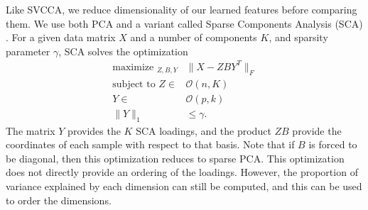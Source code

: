 Like SVCCA, we reduce dimensionality of our learned features before comparing
them. We use both PCA and a variant called Sparse Components Analysis (SCA)
\citep{chen2020new}. For a given data matrix $X$ and a number of components $K$,
and sparsity parameter $\gamma$, SCA solves the optimization
\begin{align*}
  \text{maximize }_{Z, B, Y} &\|X - Z B Y^{T}\|_{F} \\
  \text{subject to }Z \in &\mathcal{O}\left(n, K\right) \\
  Y \in &\mathcal{O}\left(p, k\right) \\
  \|Y\|_{1} &\leq \gamma.
\end{align*}
The matrix $Y$ provides the $K$ SCA loadings, and the product $ZB$ provide the
coordinates of each sample with respect to that basis. Note that if $B$ is
forced to be diagonal, then this optimization reduces to sparse PCA. This
optimization does not directly provide an ordering of the loadings. However, the
proportion of variance explained by each dimension can still be computed, and
this can be used to order the dimensions.
